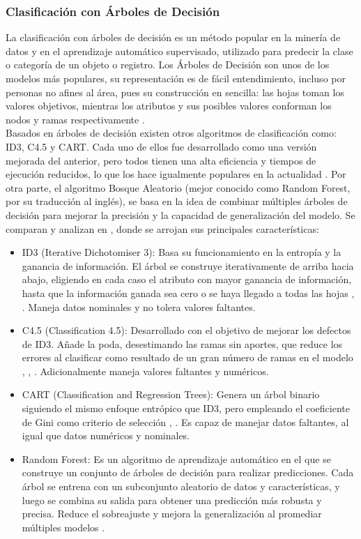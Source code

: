 \subsubsection{Clasificación con Árboles de Decisión}
La clasificación con árboles de decisión es un método popular en la minería de datos y en el aprendizaje automático supervisado, utilizado para predecir la clase o categoría de un objeto o registro. Los Árboles de Decisión son unos de los modelos más populares, su representación es de fácil entendimiento, incluso por personas no afines al área, pues su construcción en sencilla: las hojas toman los valores objetivos, mientras los atributos y sus posibles valores conforman los nodos y ramas respectivamente \citep{sammut2011encyclopedia}. \\
Basados en árboles de decisión existen otros algoritmos de clasificación como: ID3, C4.5 y CART. Cada uno de ellos fue desarrollado como una versión mejorada del anterior, pero todos tienen una alta eficiencia y tiempos de ejecución reducidos, lo que los hace igualmente populares en la actualidad \citep{javed2022performance}. Por otra parte, el algoritmo Bosque Aleatorio (mejor conocido como Random Forest, por su traducción al inglés), se basa en la idea de combinar múltiples árboles de decisión para mejorar la precisión y la capacidad de generalización del modelo. Se comparan y analizan en \citep{gupta2017analysis}, donde se arrojan sus principales características:
\begin{itemize}
	\item ID3 (Iterative Dichotomiser 3): Basa su funcionamiento en la entropía y la ganancia de información. El árbol se construye iterativamente de arriba hacia abajo, eligiendo en cada caso el atributo con mayor ganancia de información, hasta que la información ganada sea cero o se haya llegado a todas las hojas \citep{javed2022performance}, \citep{gupta2017analysis}. Maneja datos nominales y no tolera valores faltantes.
	\item C4.5 (Classification 4.5): Desarrollado con el objetivo de mejorar los defectos de ID3. Añade la poda, desestimando las ramas sin aportes, que reduce los errores al clasificar como resultado de un gran número de ramas en el modelo \citep{sammut2011encyclopedia}, \citep{javed2022performance}, \citep{gupta2017analysis}. Adicionalmente maneja valores faltantes y numéricos. 
	\item CART (Classification and Regression Trees): Genera un árbol binario siguiendo el mismo enfoque entrópico que ID3, pero empleando el coeficiente de Gini como criterio de selección \citep{javed2022performance}, \citep{gupta2017analysis}. Es capaz de manejar datos faltantes, al igual que datos numéricos y nominales.
	\item Random Forest: Es un algoritmo de aprendizaje automático en el que se construye un conjunto de árboles de decisión para realizar predicciones. Cada árbol se entrena con un subconjunto aleatorio de datos y características, y luego se combina su salida para obtener una predicción más robusta y precisa. Reduce el sobreajuste y mejora la generalización al promediar múltiples modelos \citep{gupta2017analysis}.
	
\end{itemize}

